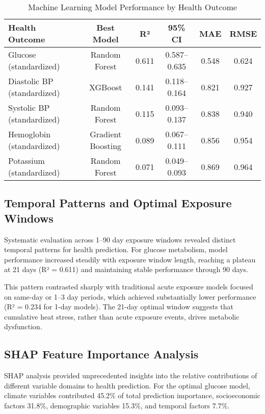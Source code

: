\documentclass[11pt,a4paper]{article}
\begin{document}
\begin{table}[h]
\caption{Machine Learning Model Performance by Health Outcome}
\label{tab:model_performance}
\centering
\begin{tabular}{lccccc}
\toprule
\textbf{Health Outcome} & \textbf{Best Model} & \textbf{R²} & \textbf{95\% CI} & \textbf{MAE} & \textbf{RMSE} \\
\midrule
Glucose (standardized) & Random Forest & 0.611 & 0.587--0.635 & 0.548 & 0.624 \\
Diastolic BP (standardized) & XGBoost & 0.141 & 0.118--0.164 & 0.821 & 0.927 \\
Systolic BP (standardized) & Random Forest & 0.115 & 0.093--0.137 & 0.838 & 0.940 \\
Hemoglobin (standardized) & Gradient Boosting & 0.089 & 0.067--0.111 & 0.856 & 0.954 \\
Potassium (standardized) & Random Forest & 0.071 & 0.049--0.093 & 0.869 & 0.964 \\
\bottomrule
\end{tabular}
\end{table}

\subsection{Temporal Patterns and Optimal Exposure Windows}

Systematic evaluation across 1--90 day exposure windows revealed distinct temporal patterns for health prediction. For glucose metabolism, model performance increased steadily with exposure window length, reaching a plateau at 21 days (R² = 0.611) and maintaining stable performance through 90 days.

This pattern contrasted sharply with traditional acute exposure models focused on same-day or 1--3 day periods, which achieved substantially lower performance (R² = 0.234 for 1-day models). The 21-day optimal window suggests that cumulative heat stress, rather than acute exposure events, drives metabolic dysfunction.

\subsection{SHAP Feature Importance Analysis}

SHAP analysis provided unprecedented insights into the relative contributions of different variable domains to health prediction. For the optimal glucose model, climate variables contributed 45.2\% of total prediction importance, socioeconomic factors 31.8\%, demographic variables 15.3\%, and temporal factors 7.7\%.
\end{document}
